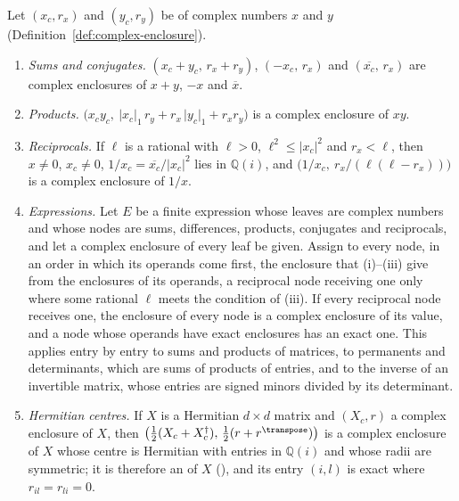 \begin{lemma}\label{lem:enclosure-arithmetic}
Let $(x_c,r_x)$ and $(y_c,r_y)$ be  of complex numbers $x$ and $y$
(Definition~\ref{def:complex-enclosure}).
\begin{enumerate}[label=(\roman*),leftmargin=2.4em]
\item \emph{Sums and conjugates.} $(x_c+y_c,\,r_x+r_y)$,
  $(-x_c,\,r_x)$ and $(\overline{x_c},\,r_x)$ are complex enclosures of
  $x+y$, $-x$ and $\overline{x}$.
\item \emph{Products.}
  $\big(x_cy_c,\ \lvert x_c\rvert_{1}\,r_y+r_x\,\lvert y_c\rvert_{1}+r_xr_y\big)$
  is a complex enclosure of $xy$.
\item \emph{Reciprocals.} If $\ell$ is a rational with $\ell>0$,
  $\ell^{2}\le\lvert x_c\rvert^{2}$ and $r_x<\ell$, then $x\neq0$, $x_c\neq0$,
  $1/x_c=\overline{x_c}/\lvert x_c\rvert^{2}$ lies in $\mathbb{Q}(i)$, and
  $\big(1/x_c,\ r_x/(\ell(\ell-r_x))\big)$ is a complex enclosure of $1/x$.
\item \emph{Expressions.} Let $E$ be a finite expression whose leaves are
  complex numbers and whose nodes are sums, differences, products,
  conjugates and reciprocals, and let a complex enclosure of every leaf be
  given. Assign to every node, in an order in which its operands come first,
  the enclosure that (i)--(iii) give from the enclosures of its operands, a
  reciprocal node receiving one only where some rational $\ell$ meets the
  condition of (iii). If every reciprocal node receives one, the enclosure of
  every node is a complex enclosure of its value, and a node whose operands
  have exact enclosures has an exact one. This applies entry by entry to sums
  and products of matrices, to permanents and determinants, which are sums of
  products of entries, and to the inverse of an invertible matrix, whose
  entries are signed minors divided by its determinant.
\item \emph{Hermitian centres.} If $X$ is a Hermitian $d\times d$ matrix and
  $(X_c,r)$ a complex enclosure of $X$, then
  $\big(\tfrac12(X_c+X_c^{\dagger}),\,\tfrac12(r+r^{\transpose})\big)$ is a
  complex enclosure of $X$ whose centre is Hermitian with entries in
  $\mathbb{Q}(i)$ and whose radii are symmetric; it is therefore an
   of $X$
  (), and its entry $(i,l)$ is exact
  where $r_{il}=r_{li}=0$.
\end{enumerate}
\end{lemma}

